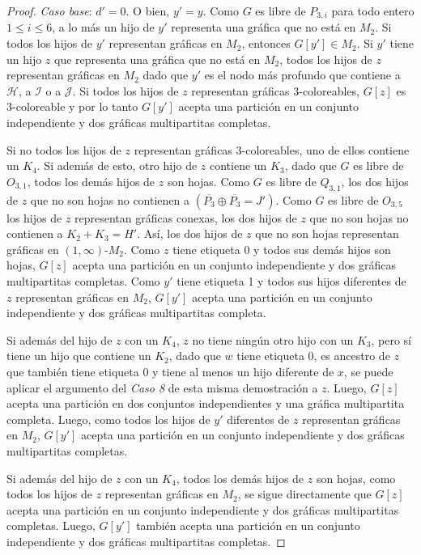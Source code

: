 \begin{proof}
\emph{Caso base}: $d'=0$. O bien, $y'=y$.
Como $G$ es libre de $P_{3,i}$ para todo entero $1\le i \le 6$, a lo más un hijo de $y'$ representa una gráfica que no está en $M_2$. Si todos los hijos de $y'$ representan gráficas en $M_2$, entonces $G[y']\in M_2$. Si $y'$ tiene un hijo $z$ que representa una gráfica que no está en $M_2$, todos los hijos de $z$ representan gráficas en $M_2$ dado que $y'$ es el nodo más profundo que contiene a $\mathcal{H}$, a $\mathcal{I}$ o a $\mathcal{J}$. Si todos los hijos de $z$ representan gráficas 3-coloreables, $G[z]$ es 3-coloreable y por lo tanto $G[y']$ acepta una partición en un conjunto independiente y dos gráficas multipartitas completas.

Si no todos los hijos de $z$ representan gráficas 3-coloreables, uno de ellos contiene un $K_4$. Si además de esto, otro hijo de $z$ contiene un $K_3$, dado que $G$ es libre de $O_{3,1}$, todos los demás hijos de $z$ son hojas. Como $G$ es libre de $Q_{3,1}$, los dos hijos de $z$ que no son hojas no contienen a $(\overline{P_3}\oplus\overline{P_3}=J')$. Como $G$ es libre de $O_{3,5}$ los hijos de $z$ representan gráficas conexas, los dos hijos de $z$ que no son hojas no contienen a $K_2+K_3=H'$. Así, los dos hijos de $z$ que no son hojas representan gráficas en $(1,\infty)$-$M_2$. Como $z$ tiene etiqueta 0 y todos sus demás hijos son hojas, $G[z]$ acepta una partición en un conjunto independiente y dos gráficas multipartitas completas. Como $y'$ tiene etiqueta 1 y todos sus hijos diferentes de $z$ representan gráficas en $M_2$, $G[y']$ acepta una partición en un conjunto independiente y dos gráficas multipartitas completa.

Si además del hijo de $z$ con un $K_4$, $z$ no tiene ningún otro hijo con un $K_3$, pero sí tiene un hijo que contiene un $K_2$, dado que $w$ tiene etiqueta 0, es ancestro de $z$ que también tiene etiqueta 0 y tiene al menos un hijo diferente de $x$, se puede aplicar el argumento del \emph{Caso 8} de esta misma demostración a $z$. Luego, $G[z]$ acepta una partición en dos conjuntos independientes y una gráfica multipartita completa. Luego, como todos los hijos de $y'$ diferentes de $z$ representan gráficas en $M_2$, $G[y']$ acepta una partición en un conjunto independiente y dos gráficas multipartitas completas.

Si además del hijo de $z$ con un $K_4$, todos los demás hijos de $z$ son hojas, como todos los hijos de $z$ representan gráficas en $M_2$, se sigue directamente que $G[z]$ acepta una partición en un conjunto independiente y dos gráficas multipartitas completas. Luego, $G[y']$ también acepta una partición en un conjunto independiente y dos gráficas multipartitas completas.


\end{proof}
